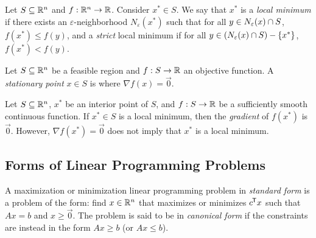 \begin{defn}
    Let $S \subseteq \mathbb{R}^n$ and $f: \mathbb{R}^n \to \mathbb{R}$. Consider $x^* \in S$. We say that $x^*$ is a \emph{local minimum} if there exists an $\varepsilon$-neighborhood $N_{\varepsilon}(x^*)$ such that for all $y \in N_{\varepsilon}(x) \cap S$, $f(x^*) \leq f(y)$, and a \emph{strict} local minimum if for all $y \in \left(N_{\varepsilon}(x) \cap S\right) - \{x^*\}$, $f(x^*) < f(y)$.
\end{defn}

\begin{defn}
    Let $S \subseteq \mathbb{R}^n$ be a feasible region and $f: S \to \mathbb{R}$ an objective function. A \emph{stationary point} $x \in S$ is where $\nabla f(x) = \vec{0}.$
\end{defn}

\begin{rmk}
    Let $S \subseteq \mathbb{R}^n$, $x^*$ be an interior point of $S$, and $f: S \to \mathbb{R}$ be a sufficiently smooth continuous function. If $x^* \in S$ is a local minimum, then the \emph{gradient} of $f(x^*)$ is $\vec{0}$. However, $\nabla f(x^*) = \vec{0}$ does not imply that $x^*$ is a local minimum.
\end{rmk}

\subsection{Forms of Linear Programming Problems}

\begin{defn}
    A maximization or minimization linear programming problem in \emph{standard form} is a problem of the form:
    find $x \in \mathbb{R}^n$ that maximizes or minimizes ${c}^{\mkern-1.5mu\mathsf{T}}x$ such that $Ax = b$ and $x \geq \vec{0}$. The problem is said to be in \emph{canonical form} if the constraints are instead in the form $Ax \geq b$ (or $Ax \leq b$).
\end{defn}

